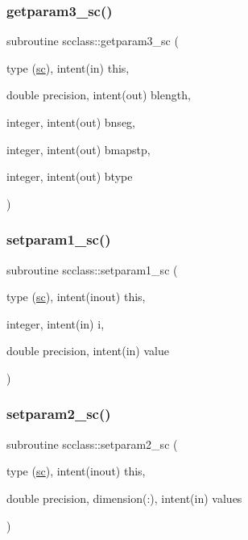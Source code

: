 \mbox{\label{namespacescclass_aaa829fed79c7f89ac09b012687895817}} 
\subsubsection{\texorpdfstring{getparam3\_sc()}{getparam3\_sc()}}
{\footnotesize\ttfamily subroutine scclass\+::getparam3\+\_\+sc (\begin{DoxyParamCaption}\item[{type (\mbox{\hyperlink{namespacescclass_structscclass_1_1sc}{sc}}), intent(in)}]{this,  }\item[{double precision, intent(out)}]{blength,  }\item[{integer, intent(out)}]{bnseg,  }\item[{integer, intent(out)}]{bmapstp,  }\item[{integer, intent(out)}]{btype }\end{DoxyParamCaption})}

\mbox{\label{namespacescclass_a23a57a64ee6a74149bbc9cf009ce8711}} 
\subsubsection{\texorpdfstring{setparam1\_sc()}{setparam1\_sc()}}
{\footnotesize\ttfamily subroutine scclass\+::setparam1\+\_\+sc (\begin{DoxyParamCaption}\item[{type (\mbox{\hyperlink{namespacescclass_structscclass_1_1sc}{sc}}), intent(inout)}]{this,  }\item[{integer, intent(in)}]{i,  }\item[{double precision, intent(in)}]{value }\end{DoxyParamCaption})}

\mbox{\label{namespacescclass_af35b79ac06dc2b6bec2d97f6e745ab20}} 
\subsubsection{\texorpdfstring{setparam2\_sc()}{setparam2\_sc()}}
{\footnotesize\ttfamily subroutine scclass\+::setparam2\+\_\+sc (\begin{DoxyParamCaption}\item[{type (\mbox{\hyperlink{namespacescclass_structscclass_1_1sc}{sc}}), intent(inout)}]{this,  }\item[{double precision, dimension(\+:), intent(in)}]{values }\end{DoxyParamCaption})}

